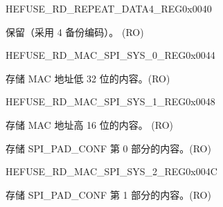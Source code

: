 \begin{register}{H}{EFUSE\_RD\_REPEAT\_DATA4\_REG}{0x0040}\label{regdesc:EFUSERDREPEATDATA4REG}
%
%
\regnewline%
\begin{regdesc}\begin{reglist}
\label{fielddesc:EFUSERPT4RESERVED4}\item [EFUSE\_RPT4\_RESERVED4] 保留（采用 4 备份编码）。 (RO)
\end{reglist}\end{regdesc}
\end{register}


\begin{register}{H}{EFUSE\_RD\_MAC\_SPI\_SYS\_0\_REG}{0x0044}\label{regdesc:EFUSERDMACSPISYS0REG}
%
\regnewline%
\begin{regdesc}\begin{reglist}
\label{fielddesc:EFUSEMAC0}\item [EFUSE\_MAC\_0] 存储 MAC 地址低 32 位的内容。(RO)
\end{reglist}\end{regdesc}
\end{register}


\begin{register}{H}{EFUSE\_RD\_MAC\_SPI\_SYS\_1\_REG}{0x0048}\label{regdesc:EFUSERDMACSPISYS1REG}
%
%
\regnewline%
\begin{regdesc}\begin{reglist}
\label{fielddesc:EFUSEMAC1}\item [EFUSE\_MAC\_1] 存储 MAC 地址高 16 位的内容。 (RO)
\label{fielddesc:EFUSESPIPADCONF0}\item [EFUSE\_SPI\_PAD\_CONF\_0] 存储 SPI\_PAD\_CONF 第 0 部分的内容。(RO)
\end{reglist}\end{regdesc}
\end{register}


\begin{register}{H}{EFUSE\_RD\_MAC\_SPI\_SYS\_2\_REG}{0x004C}\label{regdesc:EFUSERDMACSPISYS2REG}
%
\regnewline%
\begin{regdesc}\begin{reglist}
\label{fielddesc:EFUSESPIPADCONF1}\item [EFUSE\_SPI\_PAD\_CONF\_1] 存储 SPI\_PAD\_CONF 第 1 部分的内容。(RO)
\end{reglist}\end{regdesc}
\end{register}


